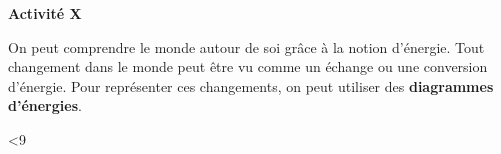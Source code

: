 \documentclass[10pt]{article}
\newcommand{\titre}{Activité X} %
\newcommand{\sep}{-4pt} %
\newcommand{\DoItNTimes}{9} %
\begin{document}
\thispagestyle{fancy}
\cfoot{}


\setcounter{int}{1}
\loop

\begin{mybox}{\textbf{\titre}}    
    \setlength\parindent{4pt} %
    \setlength\parskip{5pt} 

    On peut comprendre le monde autour de soi grâce à la notion d'énergie. Tout changement dans le monde 
    peut être vu comme un échange ou une conversion d'énergie.
    Pour représenter ces changements, on peut utiliser des \textbf{\color{DarkRed} {diagrammes d'énergies}}.

\end{mybox}

\vspace{\sep}

\addtocounter{int}{1}
\ifnum\value{int}<\DoItNTimes\repeat
\end{document}
